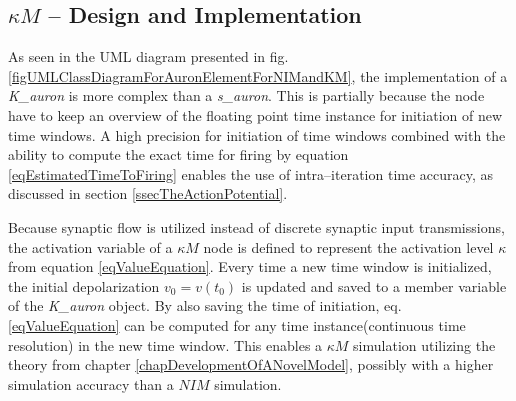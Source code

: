 		
		



	\subsection{$\kappa M$ -- Design and Implementation}
		As seen in the UML diagram presented in fig. \ref{figUMLClassDiagramForAuronElementForNIMandKM}, the implementation of a \emph{K\_auron} 
			is more complex than a \emph{s\_auron}.
		This is partially because the node have to keep an overview of the floating point time instance for initiation of new time windows.
		A high precision for initiation of time windows combined with the ability to compute the exact time for firing 
			by equation \ref{eqEstimatedTimeToFiring} enables the use of intra--iteration time accuracy, as discussed in section \ref{ssecTheActionPotential}.
		
		Because synaptic flow is utilized instead of discrete synaptic input transmissions, the activation variable of a $\kappa M$ node is defined 
			to represent the activation level $\kappa$ from equation \ref{eqValueEquation}.
		Every time a new time window is initialized, the initial depolarization $v_0 = v(t_0)$ is updated and saved to a member variable of the \emph{K\_auron} object.
		By also saving the time of initiation, eq. \eqref{eqValueEquation} can be computed for any time instance(continuous time resolution) in the new time window.
		This enables a $\kappa M$ simulation utilizing the theory from chapter \ref{chapDevelopmentOfANovelModel}, possibly with a higher simulation accuracy than a $NIM$ simulation.

